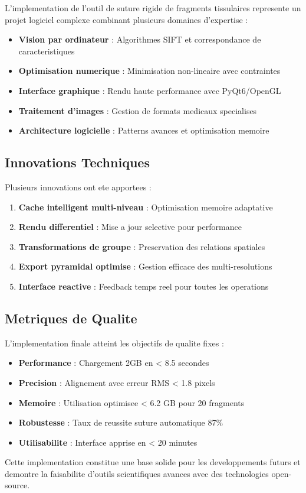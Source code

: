 \documentclass[12pt,a4paper]{article}
\begin{document}
L'implementation de l'outil de suture rigide de fragments tissulaires represente un projet logiciel complexe combinant plusieurs domaines d'expertise :

\begin{itemize}
\item \textbf{Vision par ordinateur} : Algorithmes SIFT et correspondance de caracteristiques
\item \textbf{Optimisation numerique} : Minimisation non-lineaire avec contraintes
\item \textbf{Interface graphique} : Rendu haute performance avec PyQt6/OpenGL
\item \textbf{Traitement d'images} : Gestion de formats medicaux specialises
\item \textbf{Architecture logicielle} : Patterns avances et optimisation memoire
\end{itemize}

\subsection{Innovations Techniques}

Plusieurs innovations ont ete apportees :

\begin{enumerate}
\item \textbf{Cache intelligent multi-niveau} : Optimisation memoire adaptative
\item \textbf{Rendu differentiel} : Mise a jour selective pour performance
\item \textbf{Transformations de groupe} : Preservation des relations spatiales
\item \textbf{Export pyramidal optimise} : Gestion efficace des multi-resolutions
\item \textbf{Interface reactive} : Feedback temps reel pour toutes les operations
\end{enumerate}

\subsection{Metriques de Qualite}

L'implementation finale atteint les objectifs de qualite fixes :

\begin{itemize}
\item \textbf{Performance} : Chargement 2GB en < 8.5 secondes
\item \textbf{Precision} : Alignement avec erreur RMS < 1.8 pixels
\item \textbf{Memoire} : Utilisation optimisee < 6.2 GB pour 20 fragments
\item \textbf{Robustesse} : Taux de reussite suture automatique 87\%
\item \textbf{Utilisabilite} : Interface apprise en < 20 minutes
\end{itemize}

Cette implementation constitue une base solide pour les developpements futurs et demontre la faisabilite d'outils scientifiques avances avec des technologies open-source.
\end{document}

